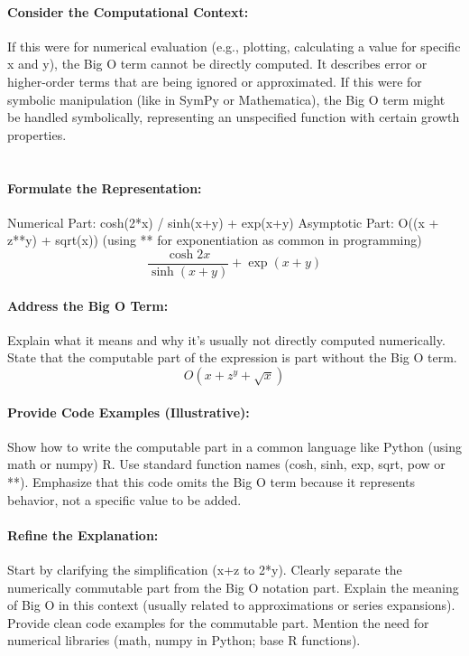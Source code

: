 \documentclass{book}
\begin{document}
\paragraph*{Consider the Computational Context:}

If this were for numerical evaluation (e.g., plotting, calculating a value for specific x and y), the Big O term cannot be directly computed. It describes error or higher-order terms that are being ignored or approximated.
If this were for symbolic manipulation (like in SymPy or Mathematica), the Big O term might be handled symbolically, representing an unspecified function with certain growth properties.
\textit{\\\\}	
\paragraph*{Formulate the Representation:}
Numerical Part: cosh(2*x) / sinh(x+y) + exp(x+y)
Asymptotic Part: O((x + z**y) + sqrt(x)) (using ** for exponentiation as common in programming)
\begin{equation}
\frac{\cosh 2 x}{\sinh \left( x + y\right) }  + \exp \left( x + y\right) 	
\end{equation}
\paragraph*{Address the Big O Term:}
 Explain what it means and why it’s usually not directly computed numerically. State that the computable part of the expression is part without the Big O term.
\begin{equation}
O\left( x + z ^{y} + \sqrt{x}\right) 	
\end{equation}
\paragraph*{Provide Code Examples (Illustrative):}

Show how to write the computable part in a common language like Python (using math or numpy) R.
Use standard function names (cosh, sinh, exp, sqrt, pow or **).
Emphasize that this code omits the Big O term because it represents behavior, not a specific value to be added.
\textit{\\}
\paragraph*{Refine the Explanation:}
Start by clarifying the simplification (x+z to 2*y).
Clearly separate the numerically commutable part from the Big O notation part.
Explain the meaning of Big O in this context (usually related to approximations or series expansions).
Provide clean code examples for the commutable part.
Mention the need for numerical libraries (math, numpy in Python; base R functions).
\end{document}
